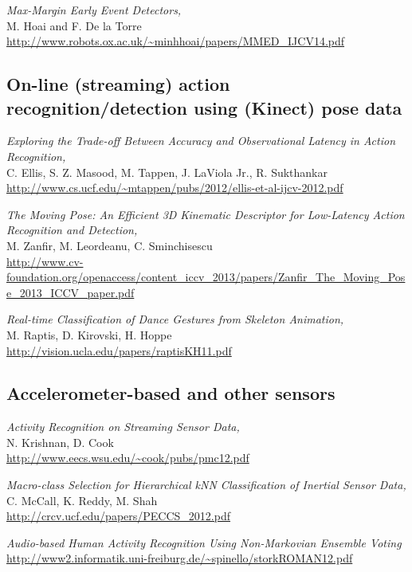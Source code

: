 \documentclass[letterpaper,12pt,fullpage]{article}
\begin{document}
{\it Max-Margin Early Event Detectors,}\\
M. Hoai and F. De la Torre\\
\url{http://www.robots.ox.ac.uk/~minhhoai/papers/MMED_IJCV14.pdf}

\subsection{On-line (streaming) action recognition/detection using (Kinect) pose data}

{\it Exploring the Trade-off Between Accuracy and Observational Latency in
Action Recognition,}\\
C. Ellis, S. Z. Masood, M. Tappen, J. LaViola Jr., R. Sukthankar\\
\url{http://www.cs.ucf.edu/~mtappen/pubs/2012/ellis-et-al-ijcv-2012.pdf}

{\it The Moving Pose: An Efficient 3D Kinematic Descriptor for Low-Latency
Action Recognition and Detection,}\\
M. Zanfir, M. Leordeanu, C. Sminchisescu\\
\url{http://www.cv-foundation.org/openaccess/content_iccv_2013/papers/Zanfir_The_Moving_Pose_2013_ICCV_paper.pdf}

{\it Real-time Classification of Dance Gestures from Skeleton Animation,}\\
M. Raptis, D. Kirovski, H. Hoppe\\
\url{http://vision.ucla.edu/papers/raptisKH11.pdf}

\subsection{Accelerometer-based and other sensors}

{\it Activity Recognition on Streaming Sensor Data,}\\
N. Krishnan, D. Cook\\
\url{http://www.eecs.wsu.edu/~cook/pubs/pmc12.pdf}

{\it Macro-class Selection for Hierarchical kNN Classification of Inertial
Sensor Data,}\\
C. McCall, K. Reddy, M. Shah\\
\url{http://crcv.ucf.edu/papers/PECCS_2012.pdf}

{\it Audio-based Human Activity Recognition Using Non-Markovian Ensemble
Voting}\\
\url{http://www2.informatik.uni-freiburg.de/~spinello/storkROMAN12.pdf}

%
%
\end{document}
